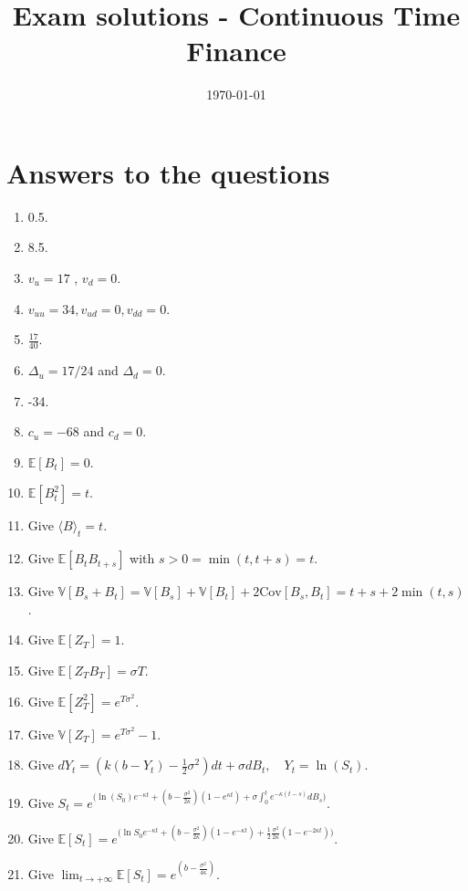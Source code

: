 \documentclass[11pt,a4paper]{article}
\theoremstyle{plain}
\theoremstyle{definition}
\begin{document}
\title{Exam solutions - Continuous Time Finance}
\author{}
\date{\today}

\maketitle


\section{Answers to the questions}
\begin{enumerate}[label=Q\arabic*., start=1]
    \item 0.5.
    \item 8.5.
    \item $v_u=17$ , $v_d=0$.
    \item $v_{uu}=34, v_{ud}=0, v_{dd} =0$.
    \item $\frac{17}{40}$.
    \item $\Delta_u=17/24$ and $\Delta_d=0$.
    \item -34.
    \item $c_u=-68$ and $c_d = 0$.
    \item $\mathbb{E}[B_t] = 0$.
    \item $\mathbb{E}[B_t^2]=t$.
    \item Give $\langle B \rangle_t = t$.
    \item Give $\mathbb{E}[B_t B_{t+s}]$ with $s > 0 = \min(t,t+s)=t$.
    \item Give $\mathbb{V}[B_s + B_t] = \mathbb{V}[B_s] + \mathbb{V}[B_t] + 2 \text{Cov}[B_s,B_t]= t + s + 2\min(t,s) $.
    \item Give $\mathbb{E}[Z_T] = 1$.
    \item Give $\mathbb{E}[Z_T B_T]=\sigma T$.
    \item Give $\mathbb{E}[Z_T^2]=e^{T \sigma^2}$.
    \item Give $\mathbb{V}[Z_T]=e^{T \sigma^2}-1$.
    \item Give $dY_t=(k(b-Y_t) - \frac{1}{2}\sigma^2)dt + \sigma dB_t, \quad Y_t = \ln(S_t)$.
    \item Give $S_t = e^{ \bigg( \ln(S_0)e^{-\kappa t} + (b-\frac{\sigma^2}{2\kappa})(1-e^{\kappa t}) + \sigma \int_0^t e^{-\kappa (t-s)}dB_s \bigg)}$.
    \item Give $\mathbb{E}[S_t]= e^{ \bigg(  \ln S_0  e^{-\kappa t} + (b-\frac{\sigma^2}{2\kappa})(1-e^{-\kappa t}) + \frac{1}{2} \frac{\sigma^2}{2\kappa}(1-e^{-2\kappa t}) \bigg)}$.
    \item Give $\lim_{t \to +\infty} \mathbb{E}[S_t] = e^{(b - \frac{\sigma^2}{4\kappa})}$.

\end{enumerate}
\end{document}
